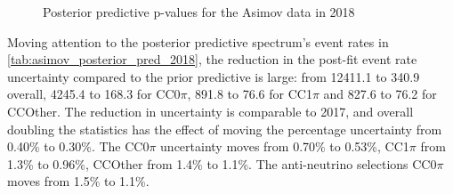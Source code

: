 \begin{figure}[h]
\begin{subfigure}[t]{0.49\textwidth}
	\end{subfigure}
	\caption{Posterior predictive p-values for the Asimov data in 2018}
	\label{fig:postpred_asimov_2018}
\end{figure}

Moving attention to the posterior predictive spectrum's event rates in \autoref{tab:asimov_posterior_pred_2018}, the reduction in the post-fit event rate uncertainty compared to the prior predictive is large: from 12411.1 to 340.9 overall, 4245.4 to 168.3 for CC0$\pi$, 891.8 to 76.6 for CC1$\pi$ and 827.6 to 76.2 for CCOther. The reduction in uncertainty is comparable to 2017, and overall doubling the statistics has the effect of moving the percentage uncertainty from 0.40\% to 0.30\%. The CC0$\pi$ uncertainty moves from 0.70\% to 0.53\%, CC1$\pi$ from 1.3\% to 0.96\%, CCOther from 1.4\% to 1.1\%. The anti-neutrino selections CC0$\pi$ moves from 1.5\% to 1.1\%.
